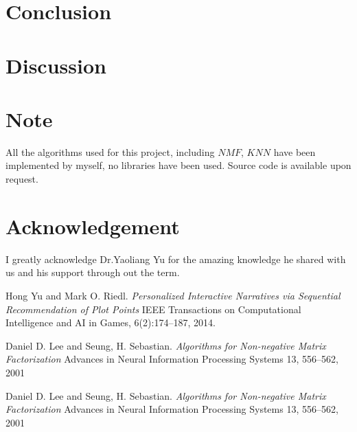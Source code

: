 \documentclass[11pt]{article} %
\begin{document}
\section{Conclusion}


\section{Discussion}

\section{Note}
All the algorithms used for this project, including $NMF$, $KNN$ have been implemented by myself, no libraries have been used. Source code is available upon request.
\section{Acknowledgement}
I greatly acknowledge Dr.Yaoliang Yu for the amazing knowledge he shared with us and his support through out the term.


\begin{thebibliography}{9}
Hong Yu and Mark O. Riedl.
\textit{Personalized Interactive Narratives via Sequential
Recommendation of Plot Points}
IEEE Transactions on Computational Intelligence and AI in Games, 6(2):174–187, 2014.

Daniel D. Lee and Seung, H. Sebastian.
\textit{Algorithms for Non-negative Matrix Factorization}
Advances in Neural Information Processing Systems 13, 556--562, 2001

Daniel D. Lee and Seung, H. Sebastian.
\textit{Algorithms for Non-negative Matrix Factorization}
Advances in Neural Information Processing Systems 13, 556--562, 2001

\end{thebibliography}
\end{document}
